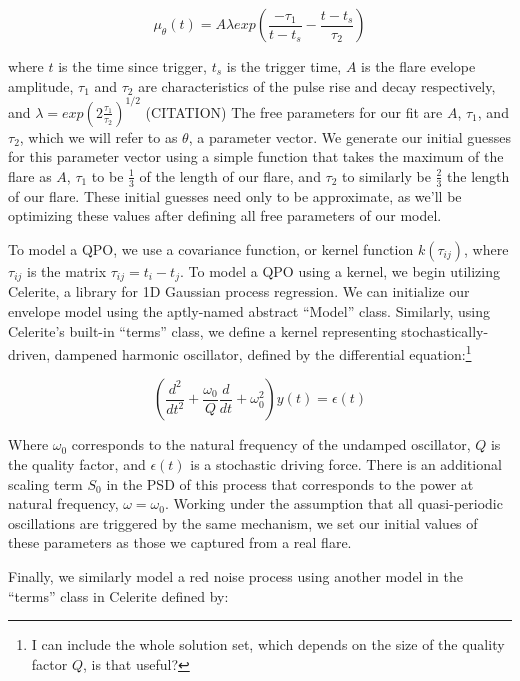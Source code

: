 \documentclass{aastex61}
\begin{document}
\begin{equation}
	\mu_{\theta}(t) = A \lambda exp{\left( \frac{-\tau_1}{t-t_s}-\frac{t-t_s}{\tau_2}\right)}
	\label{model}
\end{equation}

where $t$ is the time since trigger, $t_s$ is the trigger time, $A$ is the flare evelope amplitude, $\tau_1$ and $\tau_2$ are characteristics of the pulse rise and decay respectively, and 
$\lambda = exp(2\frac{\tau_1}{\tau_2})^{1/2}$ (CITATION)
The free parameters for our fit are $A$, $\tau_1$, and $\tau_2$, which we will refer to as $\theta$, a parameter vector.
We generate our initial guesses for this parameter vector using a simple function that takes the maximum of the flare as $A$, $\tau_1$ to be $\frac{1}{3}$ of the length of our flare, and $\tau_2$ to similarly be $\frac{2}{3}$ the length of our flare.
These initial guesses need only to be approximate, as we'll be optimizing these values after defining all free parameters of our model.

To model a QPO, we use a covariance function, or kernel function $k(\tau_{ij})$, where $\tau_{ij}$ is the matrix $\tau_{ij} = t_i-t_j$. To model a QPO using a kernel, we begin utilizing Celerite, a library for 1D Gaussian process regression. We can initialize our envelope model using the aptly-named abstract ``Model'' class.
Similarly, using Celerite's built-in ``terms'' class, we define a kernel representing stochastically-driven, dampened harmonic oscillator, defined by the differential equation:\footnote{I can include the whole solution set, which depends on the size of the quality factor $Q$, is that useful?}


\begin{equation}
	\left( \frac{d^2}{dt^2} + \frac{\omega_0}{Q} \frac{d}{dt} + \omega_0^2 \right) y(t) = \epsilon(t) 
	\label{sho}
\end{equation}

Where $\omega_0$ corresponds to the natural frequency of the undamped oscillator, $Q$ is the quality factor, and $\epsilon(t)$ is a stochastic driving force.
There is an additional scaling term $S_0$ in the PSD of this process that corresponds to the power at natural frequency, $\omega=\omega_0$.
Working under the assumption that all quasi-periodic oscillations are triggered by the same mechanism, we set our initial values of these parameters as those we captured from a real flare.

Finally, we similarly model a red noise process using another model in the ``terms'' class in Celerite defined by:
\end{document}

